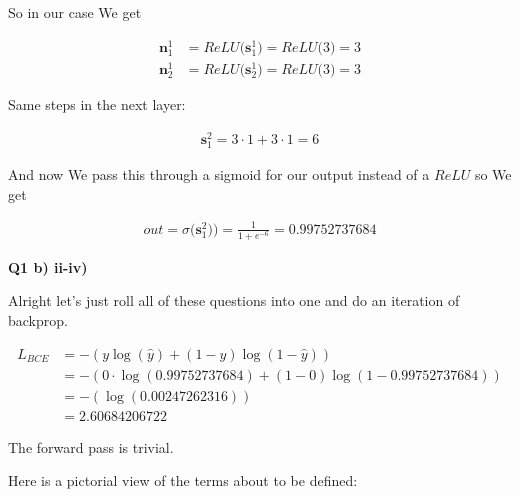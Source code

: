 \documentclass{article}
\begin{document}
	So in our case We get
	
	\begin{align}
		\mathbf{n}^1_1 &= ReLU\big(\mathbf{s}^1_1\big) =  ReLU\big( 3 \big) = 3\\
	\mathbf{n}^1_2 &= ReLU\big(\mathbf{s}^1_2\big) =  ReLU\big( 3 \big) = 3	
	\end{align}
	
	Same steps in the next layer:
	
	\begin{align}
		\mathbf{s}^2_1 = 3\cdot 1 + 3\cdot 1 = 6
	\end{align}
	
	And now We pass this through a sigmoid for our output instead of a $ReLU$ so We get
	
	\begin{align}
		out = \sigma\big(\mathbf{s}^2_1)\big) = \frac{1}{1+e^{-6}} = 0.99752737684
	\end{align}


	
\textbf{Q1 b) ii-iv)}

	Alright let's just roll all of these questions into one and do an iteration of backprop.

	\begin{align}
		L_{BCE} &= -(y\log(\hat{y}) + (1-y)\log(1-\hat{y}))\\
		&= -(0\cdot\log(0.99752737684) + (1-0)\log(1-0.99752737684))\\
		&= -(\log(0.00247262316))\\
		&= 2.60684206722
	\end{align}
	
	The forward pass is trivial.
	
	Here is a pictorial view of the terms about to be defined:
	
\end{document}

